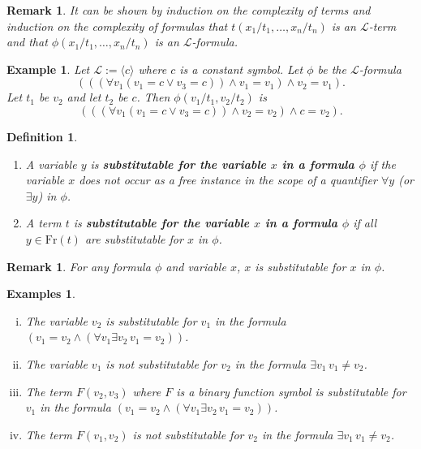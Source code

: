\documentclass[11pt]{article}
\newcommand{\Fr}{\textrm{Fr}}
\newtheorem*{remark*}{Remark}
\newtheorem{example}[theorem]{Example}
\newtheorem{remark}[theorem]{Remark}
\newtheorem{examples}[theorem]{Examples}
\newtheorem{definition}[theorem]{Definition}
\newcommand{\mcal}[1]{\mathcal{#1}}
\begin{document}
\begin{remark}
It can be shown by induction on the complexity of terms and induction on the complexity of formulas that $t(x_1/t_1,\ldots,x_n/t_n)$ is an $\mcal{L}$-term and that $\phi(x_1/t_1,\ldots,x_n/t_n)$ is an $\mcal{L}$-formula.
\end{remark}

\begin{example}
Let $\mcal{L}:=\langle c\rangle$ where $c$ is a constant symbol. Let $\phi$ be the $\mcal{L}$-formula
\[(((\forall v_1 (v_1=c\vee v_3=c))\wedge v_1=v_1)\wedge v_2=v_1).\] Let $t_1$ be $v_2$ and let $t_2$ be $c$. Then $\phi(v_1/t_1,v_2/t_2)$ is
\[(((\forall v_1 (v_1=c\vee v_3=c))\wedge v_2=v_2)\wedge c=v_2).\]
\end{example}

\begin{definition}
\
\begin{enumerate}[(1)]
\item A variable $y$ is \textbf{substitutable for the variable $x$ in a formula $\phi$} if the variable $x$ does not occur as a free instance in the scope of a quantifier $\forall y$ (or $\exists y$) in $\phi$.
\item A term $t$ is \textbf{substitutable for the variable $x$ in a formula $\phi$} if all $y\in \Fr(t)$ are substitutable for $x$ in $\phi$.
\end{enumerate}
\end{definition}

\begin{remark*}
For any formula $\phi$ and variable $x$, $x$ is substitutable for $x$ in $\phi$.
\end{remark*}

\begin{examples}
\
\begin{enumerate}[(i)]
\item The variable $v_2$ is substitutable for $v_1$ in the formula $(v_1=v_2\wedge (\forall v_1 \exists v_2 \, v_1=v_2))$.
\item The variable $v_1$ is not substitutable for $v_2$ in the formula $\exists v_1 \, v_1\neq v_2$.
\item The term $F(v_2,v_3)$ where $F$ is a binary function symbol is substitutable for $v_1$ in the formula $(v_1=v_2\wedge (\forall v_1 \exists v_2 \, v_1=v_2))$.
\item The term $F(v_1,v_2)$ is not substitutable for $v_2$ in the formula $\exists v_1 \, v_1\neq v_2$.
\end{enumerate}
\end{examples}
\end{document}
